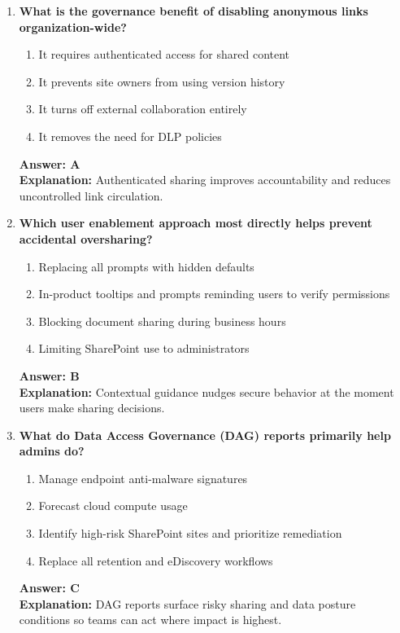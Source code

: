 \documentclass[10pt]{article}
\begin{document}
\begin{enumerate}[leftmargin=*]
\item \textbf{What is the governance benefit of disabling anonymous links organization-wide?}
\begin{enumerate}[label=\Alph*.]
  \item It requires authenticated access for shared content
  \item It prevents site owners from using version history
  \item It turns off external collaboration entirely
  \item It removes the need for DLP policies
\end{enumerate}
\textbf{Answer: A}\\
\textbf{Explanation:} Authenticated sharing improves accountability and reduces uncontrolled link circulation.

\item \textbf{Which user enablement approach most directly helps prevent accidental oversharing?}
\begin{enumerate}[label=\Alph*.]
  \item Replacing all prompts with hidden defaults
  \item In-product tooltips and prompts reminding users to verify permissions
  \item Blocking document sharing during business hours
  \item Limiting SharePoint use to administrators
\end{enumerate}
\textbf{Answer: B}\\
\textbf{Explanation:} Contextual guidance nudges secure behavior at the moment users make sharing decisions.

\item \textbf{What do Data Access Governance (DAG) reports primarily help admins do?}
\begin{enumerate}[label=\Alph*.]
  \item Manage endpoint anti-malware signatures
  \item Forecast cloud compute usage
  \item Identify high-risk SharePoint sites and prioritize remediation
  \item Replace all retention and eDiscovery workflows
\end{enumerate}
\textbf{Answer: C}\\
\textbf{Explanation:} DAG reports surface risky sharing and data posture conditions so teams can act where impact is highest.


\end{enumerate}
\end{document}
